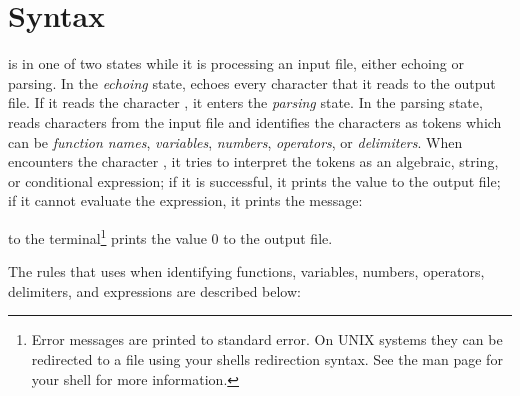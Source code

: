 \chapter{Syntax}\label{ch:syntax}

\aprepro{} is in one of two states while it is processing an input file, 
either echoing or parsing. In the \textit{echoing} state, \aprepro{}
echoes every character that it reads to the output file. If it reads
the character \cmd{\{}, it enters the \textit{parsing} state. In
the parsing state, \aprepro{} reads characters from the input file
and identifies the characters as tokens which can be \textit{function
names}, \textit{variables}, \textit{numbers}, \textit{operators}, or
\textit{delimiters}.  When \aprepro{} encounters the character
\cmd{\}}, it tries to interpret the tokens as an algebraic, string,
or conditional expression; if it is successful, it prints the value
to the output file; if it cannot evaluate the expression, it prints
the message:


to the terminal\footnote{Error messages are printed to standard
error. On UNIX systems they can be redirected to a file using your
shells redirection syntax. See the man page for your shell for more
information.} prints the value 0 to the output file.

The rules that \aprepro{} uses when identifying functions, variables, numbers, 
operators, delimiters, and expressions are described below:


